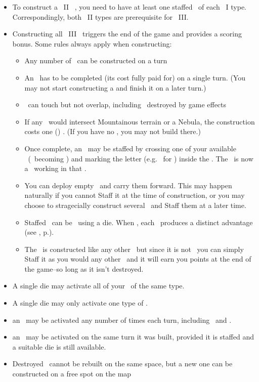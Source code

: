 \begin{itemize}
	\item To construct a \level\ II \armament\ , you need to have at least one staffed \armament\ of each \level\ I type.  Correspondingly, both \level\ II types are prerequisite for \level\ III.
	\item Constructing all \level\ III \armaments\ triggers the end of the game and provides a scoring bonus.  Some rules always apply when constructing:
  \begin{itemize}
    \item Any number of \armaments\ can be constructed on a turn
    \item An \armament\ has to be completed (its cost fully paid for) on a single turn. (You may not start constructing a \armament and finish it on a later turn.)
    \item \armaments\ can touch but not overlap, including \armaments\ destroyed by game effects
    \item If any \armaments\ would intersect Mountainous terrain or a Nebula, the construction costs one (\spendcurrency) \currency. (If you have no \currency, you may not build there.)
    \item Once complete, an \armament\ may be staffed by crossing one of your available \astronauts\ (\gainastronautsymbol\ becoming \useastronautsymbol) and marking the letter (e.g. \academysymbol\ for \academy) inside the \armament. The \astronaut\ is now a \specialist\ working in that \armament.
    \item You can deploy empty \armaments\ and carry them forward.  This may happen naturally if you cannot Staff it at the time of construction, or you may choose to stragecially construct several \armaments\ and Staff them at a later time.
		\item Staffed \armaments\ can be \activated\ using a die.  When \activated, each \armament\ produces a distinct advantage (see , p.\pageref{sec:armaments}).
	  \item The \spacestation\ is constructed like any other \armaments\ but since it is not \activated\ you can simply Staff it as you would any other \armaments\ and it will earn you points at the end of the game--so long as it isn't destroyed.
  \end{itemize}
  \item A single die may activate all of your \armaments\ of the same type.
  \item A single die may only activate one type of \armament.
  \item an \armament\ may be activated any number of times each turn, including \starships\ and \battleships.
  \item an \armament\ may be activated on the same turn it was built, provided it is staffed and a suitable die is still available.
  \item Destroyed \armaments\ cannot be rebuilt on the same space, but a new one can be constructed on a free spot on the map
\end{itemize}
